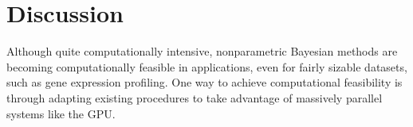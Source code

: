 % 
% 

\section{Discussion}
\label{sec:discussion}
Although quite computationally intensive, nonparametric Bayesian methods are becoming computationally feasible in applications, even for fairly sizable datasets, such as gene expression profiling. One way to achieve computational feasibility is through adapting existing procedures to take advantage of massively parallel systems like the GPU.

